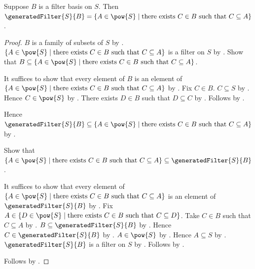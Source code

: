 \begin{theorem}\label{filter_basis_generated_filter_eq_supersets}
    Suppose $B$ is a filter basis on $S$.
    Then $\generatedFilter{S}{B}=
        \{A\in\pow{S}\mid
            \text{there exists $C\in B$ such that $C\subseteq A$}\}$.
\end{theorem}
\begin{proof}
    $B$ is a family of subsets of $S$ by .
    $\{A\in\pow{S}\mid
        \text{there exists $C\in B$ such that $C\subseteq A$}\}$
        is a filter on $S$ by .
    Show that $B\subseteq
        \{A\in\pow{S}\mid
            \text{there exists $C\in B$ such that $C\subseteq A$}\}$.
    \begin{subproof}
        It suffices to show that every element of $B$ is an element of
            $\{A\in\pow{S}\mid
                \text{there exists $C\in B$ such that $C\subseteq A$}\}$
            by .
        Fix $C\in B$.
        $C\subseteq S$ by .
        Hence $C\in\pow{S}$ by .
        There exists $D\in B$ such that $D\subseteq C$
            by .
        Follows by \auto.
    \end{subproof}
    Hence $\generatedFilter{S}{B}\subseteq
        \{A\in\pow{S}\mid
            \text{there exists $C\in B$ such that $C\subseteq A$}\}$
        by .

    Show that
        $\{A\in\pow{S}\mid
            \text{there exists $C\in B$ such that $C\subseteq A$}\}
        \subseteq\generatedFilter{S}{B}$.
    \begin{subproof}
        It suffices to show that every element of
            $\{A\in\pow{S}\mid
                \text{there exists $C\in B$ such that $C\subseteq A$}\}$
            is an element of $\generatedFilter{S}{B}$ by .
        Fix $A\in\{D\in\pow{S}\mid
            \text{there exists $C\in B$ such that $C\subseteq D$}\}$.
        Take $C\in B$ such that $C\subseteq A$ by \auto.
        $B\subseteq\generatedFilter{S}{B}$ by
            .
        Hence $C\in\generatedFilter{S}{B}$ by .
        $A\in\pow{S}$ by \auto.
        Hence $A\subseteq S$ by .
        $\generatedFilter{S}{B}$ is a filter on $S$ by
            .
        Follows by .
    \end{subproof}
    Follows by .
\end{proof}

